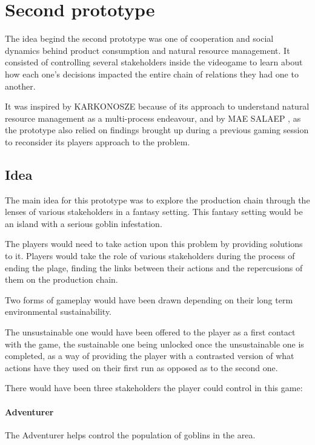 \section{Second prototype}

The idea begind the second prototype was one of cooperation and social
dynamics behind product consumption and natural resource management. It
consisted of controlling several stakeholders inside the videogame to learn
about how each one's decisions impacted the entire chain of relations they
had one to another.

It was inspired by KARKONOSZE \cite{Krolikowska2007} because
of its approach to understand natural resource management
as a multi-process endeavour, and by MAE SALAEP \cite{Barnaud2007},
as the prototype also relied on findings brought up during a previous
gaming session to reconsider its players approach to the problem.

\subsection{Idea}

The main idea for this prototype was to explore the production chain through the lenses of various stakeholders in a fantasy setting. This fantasy setting
would be an island with a serious \gls{goblin} infestation.

The players would need to take action upon this problem by providing solutions to it.
Players would take the role of various stakeholders during the process
of ending the plage, finding the links between their actions and the repercusions
of them on the production chain.

Two forms of gameplay would have been drawn depending on their long term environmental sustainability. 

The unsustainable one would have been offered to the player as a first contact with the game,
the sustainable one being unlocked once the unsustainable one is completed,
as a way of providing the player with a contrasted version of what actions
have they used on their first run as opposed as to the second one.

There would have been three stakeholders the player could control
in this game:

\paragraph{Adventurer}
The Adventurer helps control the population of goblins in the area.

